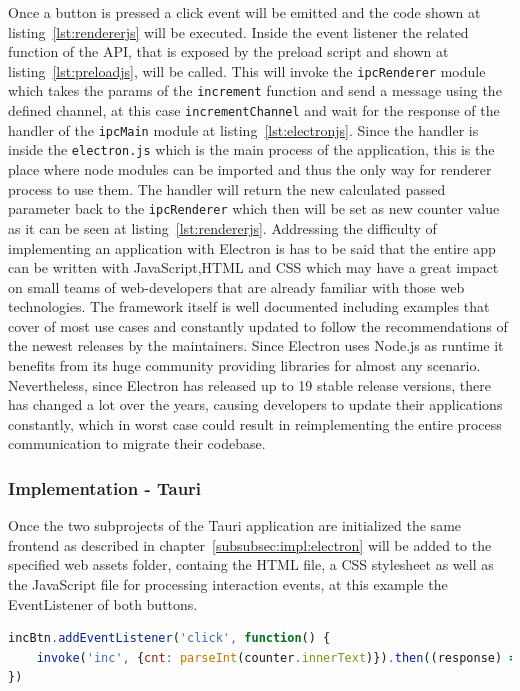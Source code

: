 Once a button is pressed a click event will be emitted and the code shown at listing~\ref{lst:rendererjs} will be executed.
Inside the event listener the related function of the \ac{API}, that is exposed by the preload script and shown at listing~\ref{lst:preloadjs}, will be called.
This will invoke the \texttt{ipcRenderer} module which takes the params of the \texttt{increment} function and send a message using the defined channel, at this case \texttt{incrementChannel} and wait for the response of the handler of the
\texttt{ipcMain} module at listing~\ref{lst:electronjs}.
Since the handler is inside the \texttt{electron.js} which is the main process of the application, this is the place where node modules can be imported and thus the only way for renderer process to use them.
The handler will return the new calculated passed parameter back to the \texttt{ipcRenderer} which then will be set as new counter value as it can be seen at listing~\ref{lst:rendererjs}.
Addressing the difficulty of implementing an application with Electron is has to be said that the entire app can be written with JavaScript,\ac{HTML} and \ac{CSS} which may have a great impact
on small teams of web-developers that are already familiar with those web technologies.
The framework itself is well documented including examples that cover of most use cases and constantly updated to follow the recommendations of the newest releases by the maintainers.
Since Electron uses Node.js as runtime it benefits from its huge community providing libraries for almost any scenario.
Nevertheless, since Electron has released up to 19 stable release versions, there has changed a lot over the years, causing developers to update their applications constantly, which in worst case could result
in reimplementing the entire process communication to migrate their codebase.
\subsubsection{Implementation - Tauri}
Once the two subprojects of the Tauri application are initialized the same frontend as described in chapter~\ref{subsubsec:impl:electron} will be added to the specified web assets folder,
containg the \ac{HTML} file, a \ac{CSS} stylesheet as well as the JavaScript file for processing interaction events, at this example the EventListener of both buttons.

\begin{lstlisting}[language=JavaScript,label={lst:indexjsTauri}, caption={Excerpt of index.js}]
incBtn.addEventListener('click', function() {
    invoke('inc', {cnt: parseInt(counter.innerText)}).then((response) => counter.innerText=response)
})
\end{lstlisting}

